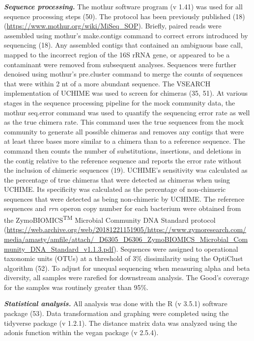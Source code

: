 \documentclass[11pt,]{article}
\begin{document}
\textbf{\emph{Sequence processing.}} The mothur software program (v
1.41) was used for all sequence processing steps (50). The protocol has
been previously published (18)
(\url{https://www.mothur.org/wiki/MiSeq_SOP}). Briefly, paired reads
were assembled using mothur's make.contigs command to correct errors
introduced by sequencing (18). Any assembled contigs that contained an
ambiguous base call, mapped to the incorrect region of the 16S rRNA
gene, or appeared to be a contaminant were removed from subsequent
analyses. Sequences were further denoised using mothur's pre.cluster
command to merge the counts of sequences that were within 2 nt of a more
abundant sequence. The VSEARCH implementation of UCHIME was used to
screen for chimeras (35, 51). At various stages in the sequence
processing pipeline for the mock community data, the mothur seq.error
command was used to quantify the sequencing error rate as well as the
true chimera rate. This command uses the true sequences from the mock
community to generate all possible chimeras and removes any contigs that
were at least three bases more similar to a chimera than to a reference
sequence. The command then counts the number of substitutions,
insertions, and deletions in the contig relative to the reference
sequence and reports the error rate without the inclusion of chimeric
sequences (19). UCHIME's sensitivity was calculated as the percentage of
true chimeras that were detected as chimeras when using UCHIME. Its
specificity was calculated as the percentage of non-chimeric sequences
that were detected as being non-chimeric by UCHIME. The reference
sequences and \emph{rrn} operon copy number for each bacterium were
obtained from the ZymoBIOMICS\textsuperscript{TM} Microbial Community
DNA Standard protocol
(\url{https://web.archive.org/web/20181221151905/https://www.zymoresearch.com/media/amasty/amfile/attach/_D6305_D6306_ZymoBIOMICS_Microbial_Community_DNA_Standard_v1.1.3.pdf}).
Sequences were assigned to operational taxonomic units (OTUs) at a
threshold of 3\% dissimilarity using the OptiClust algorithm (52). To
adjust for unequal sequencing when measuring alpha and beta diversity,
all samples were rarefied for downstream analysis. The Good's coverage
for the samples was routinely greater than 95\%.

\textbf{\emph{Statistical analysis.}} All analysis was done with the R
(v 3.5.1) software package (53). Data transformation and graphing were
completed using the tidyverse package (v 1.2.1). The distance matrix
data was analyzed using the adonis function within the vegan package (v
2.5.4).
\end{document}
